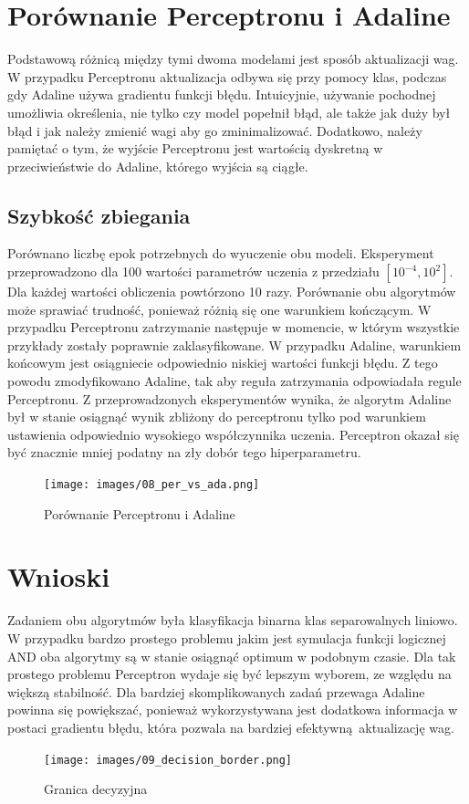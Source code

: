 \documentclass{article}
\begin{document}
\section{Porównanie Perceptronu i Adaline}
Podstawową różnicą między tymi dwoma modelami jest sposób aktualizacji wag.
W przypadku Perceptronu aktualizacja odbywa się przy pomocy klas, podczas gdy Adaline używa gradientu funkcji błędu.
Intuicyjnie, używanie pochodnej umożliwia określenia, nie tylko czy model popełnił błąd, ale także jak duży był błąd
i jak należy zmienić wagi aby go zminimalizować.
Dodatkowo, należy pamiętać o tym, że wyjście Perceptronu jest wartością dyskretną w przeciwieństwie do Adaline, którego wyjścia są ciągłe.

\subsection{Szybkość zbiegania}
Porównano liczbę epok potrzebnych do wyuczenie obu modeli.
Eksperyment przeprowadzono dla 100 wartości parametrów uczenia z przedziału $\left[10^{-4}, 10^{2}\right]$.
Dla każdej wartości obliczenia powtórzono 10 razy.
Porównanie obu algorytmów może sprawiać trudność, ponieważ różnią się one warunkiem kończącym.
W przypadku Perceptronu zatrzymanie następuje w momencie, w którym wszystkie przykłady zostały poprawnie zaklasyfikowane.
W przypadku Adaline, warunkiem końcowym jest osiągniecie odpowiednio niskiej
wartości funkcji błędu.
Z tego powodu zmodyfikowano Adaline, tak aby reguła zatrzymania odpowiadała regule Perceptronu. 
Z przeprowadzonych eksperymentów wynika, że algorytm Adaline był w stanie osiągnąć wynik zbliżony do perceptronu tylko pod warunkiem ustawienia odpowiednio wysokiego współczynnika uczenia.
Perceptron okazał się być znacznie mniej podatny na zły dobór tego hiperparametru.

\begin{figure}[h]
  \caption{Porównanie Perceptronu i Adaline}
  \centering
    \texttt{[image: images/08\_per\_vs\_ada.png]}
\end{figure}

\FloatBarrier

\newpage
\section{Wnioski}
Zadaniem obu algorytmów była klasyfikacja binarna klas separowalnych liniowo.
W przypadku bardzo prostego problemu jakim jest symulacja funkcji logicznej AND
oba algorytmy są w stanie osiągnąć optimum w podobnym czasie.
Dla tak prostego problemu Perceptron wydaje się być lepszym wyborem, ze względu na większą stabilność.
Dla bardziej skomplikowanych zadań przewaga Adaline powinna się powiększać,
ponieważ wykorzystywana jest dodatkowa informacja w postaci gradientu błędu,
która pozwala na bardziej efektywną aktualizację wag.

\begin{figure}[h]
  \caption{Granica decyzyjna}
  \centering
    \texttt{[image: images/09\_decision\_border.png]}
\end{figure}
\end{document}
